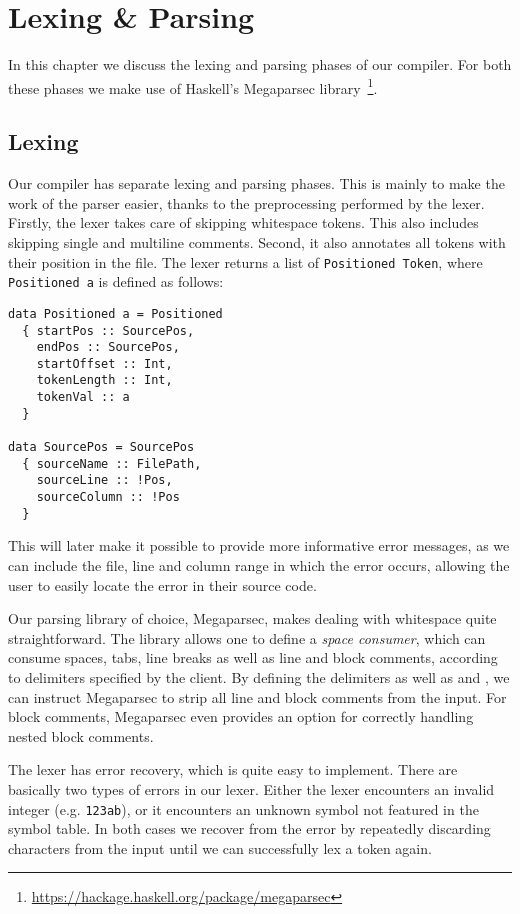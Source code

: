 \chapter{Lexing \& Parsing}

In this chapter we discuss the lexing and parsing phases of our compiler.
For both these phases we make use of Haskell's Megaparsec
library~\footnote{\url{https://hackage.haskell.org/package/megaparsec}}.

\section{Lexing}
Our compiler has separate lexing and parsing phases.
This is mainly to make the work of the parser easier, thanks to the preprocessing
performed by the lexer.
Firstly, the lexer takes care of skipping whitespace tokens.
This also includes skipping single and multiline comments.
Second, it also annotates all tokens with their position in the file.
The lexer returns a list of \texttt{Positioned Token},
where \texttt{Positioned a} is defined as follows:
\begin{verbatim}
data Positioned a = Positioned
  { startPos :: SourcePos,
    endPos :: SourcePos,
    startOffset :: Int,
    tokenLength :: Int,
    tokenVal :: a
  }

data SourcePos = SourcePos
  { sourceName :: FilePath,
    sourceLine :: !Pos,
    sourceColumn :: !Pos
  }
\end{verbatim}
This will later make it possible to provide more informative error messages, as
we can include the file, line and column range in which the error occurs,
allowing the user to easily locate the error in their source code.

Our parsing library of choice, Megaparsec, makes dealing with whitespace quite
straightforward. The library allows one to define a \emph{space consumer}, which
can consume spaces, tabs, line breaks as well as line and block comments,
according to delimiters specified by the client.
By defining the delimiters \code{//} as well as \code{/*} and \code{*/}, we can
instruct Megaparsec to strip all line and block comments from the input.
For block comments, Megaparsec even provides an option for correctly handling
nested block comments.

The lexer has error recovery, which is quite easy to implement.
There are basically two types of errors in our lexer.
Either the lexer encounters an invalid integer (e.g. \verb|123ab|),
or it encounters an unknown symbol not featured in the symbol table.
In both cases we recover from the error by repeatedly discarding characters from
the input until we can successfully lex a token again.


